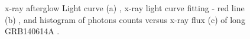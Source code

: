 \begin{figure}[hpbt]
\caption{x-ray  afterglow Light curve (a) , x-ray  light curve fitting - red line (b) , and histogram  of  photons counts  versus x-ray flux  (c)  of long GRB140614A .}
\end{figure}
